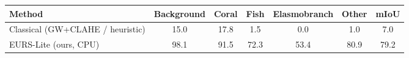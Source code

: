 \begin{tabular}{lcccccc}
\toprule
Method & Background & Coral & Fish & Elasmobranch & Other & mIoU \\
\midrule
Classical (GW+CLAHE / heuristic) & 15.0 & 17.8 & 1.5 & 0.0 & 1.0 & 7.0 \\
EURS-Lite (ours, CPU) & 98.1 & 91.5 & 72.3 & 53.4 & 80.9 & 79.2 \\
\bottomrule
\end{tabular}
